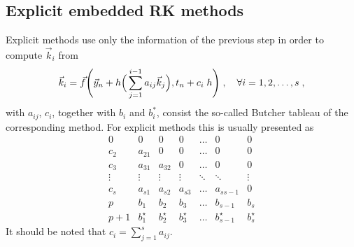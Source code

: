 \documentclass[11pt,a4paper]{article}
\begin{document}
\subsection{Explicit embedded RK methods}
%
Explicit methods use only the information of the previous step in order to compute $\vec{k}_i$ from  
%
\begin{equation}
	\vec{k}_{i}=\vec f\Bigg(  \vec{y}_{n}+h \Big(  \sum_{j=1}^{i-1}a_{ij}\vec{k}_{j}  \Big), t_{n}+ c_{i} \; h \Bigg)\;, \quad \forall i=1,2,\dots, s\;,
	\label{eq:explicit_RK_k}
\end{equation}
%
with $a_{ij}$, $c_i$, together with $b_i$ and $b_i^{*}$, consist the so-called Butcher tableau of the corresponding method. For explicit methods this is usually presented as 
%
\begin{equation}
	\begin{array}{c|cccccc}
		0      & 0      &   0   &      0& \dots & 0& 0\\
		c_2    & a_{21} &   0   &   0   & \dots & 0& 0\\
		c_3    & a_{31} & a_{32}&      0& \dots & 0& 0\\
		\vdots & \vdots & \vdots& \vdots&\ddots &\ddots& \vdots\\
		c_s    & a_{s1} & a_{s2}& a_{s3}& \dots & a_{s s-1}& 0 \\
		\hline
		p      & b_1    & b_2  & b_3 & \dots & b_{s-1} & b_s \\
		p+1      & b_1^{\star}    & b_2^{\star}  & b_3^{\star} & \dots & b_{s-1}^{\star} & b_s^{\star}
	\end{array}
	\label{eq:Butcher}
\end{equation}
%
It should be noted that $c_i = \displaystyle\sum_{j=1}^{s} a_{ij} $.
\end{document}
